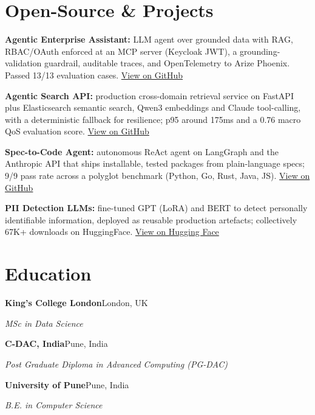\documentclass[10pt,a4paper]{article}
\begin{document}
\section{Open-Source \& Projects}
\begin{tight}
  \item \textbf{Agentic Enterprise Assistant:} LLM agent over grounded data with RAG, RBAC/OAuth enforced at an MCP server (Keycloak JWT), a grounding-validation guardrail, auditable traces, and OpenTelemetry to Arize Phoenix. Passed 13/13 evaluation cases. \href{https://github.com/abhijeetscode/Agentic-Enterprise-Assistant}{View on GitHub}
  \item \textbf{Agentic Search API:} production cross-domain retrieval service on FastAPI plus Elasticsearch semantic search, Qwen3 embeddings and Claude tool-calling, with a deterministic fallback for resilience; p95 around 175ms and a 0.76 macro QoS evaluation score. \href{https://github.com/abhijeetscode/search-agent}{View on GitHub}
  \item \textbf{Spec-to-Code Agent:} autonomous ReAct agent on LangGraph and the Anthropic API that ships installable, tested packages from plain-language specs; 9/9 pass rate across a polyglot benchmark (Python, Go, Rust, Java, JS). \href{https://github.com/abhijeetscode/Spec-to-Code-Agent}{View on GitHub}
  \item \textbf{PII Detection LLMs:} fine-tuned GPT (LoRA) and BERT to detect personally identifiable information, deployed as reusable production artefacts; collectively 67K+ downloads on HuggingFace. \href{https://huggingface.co/ab-ai/pii_model}{View on Hugging Face}
\end{tight}

\section{Education}
{\color{company}\bfseries King's College London}\hfill {\color{muted}London, UK}\par
{\itshape MSc in Data Science}\par\vspace{1pt}
{\color{company}\bfseries C-DAC, India}\hfill {\color{muted}Pune, India}\par
{\itshape Post Graduate Diploma in Advanced Computing (PG-DAC)}\par\vspace{1pt}
{\color{company}\bfseries University of Pune}\hfill {\color{muted}Pune, India}\par
{\itshape B.E. in Computer Science}\par
\end{document}
